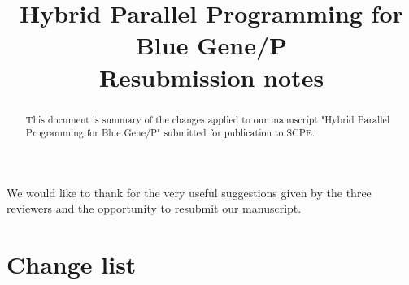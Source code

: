 \documentclass[preprint,3p,times]{elsarticle}
\begin{document}
\begin{frontmatter}

\title{Hybrid Parallel Programming for Blue Gene/P \\ Resubmission notes}

\begin{abstract}
This document is summary of the changes applied to our manuscript "Hybrid Parallel Programming for Blue Gene/P" submitted for publication to SCPE.
\end{abstract}
\end{frontmatter}

We would like to thank for the very useful suggestions given by the three reviewers and the opportunity to resubmit our manuscript.

\section*{Change list}
\end{document}
